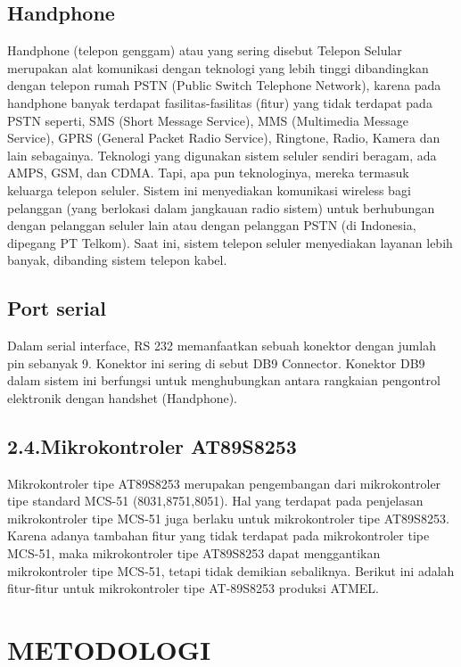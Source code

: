 \documentclass{jtetiproposalskripsi}
\begin{document}
\section{Handphone}
Handphone (telepon genggam) atau yang sering disebut Telepon Selular merupakan alat komunikasi dengan teknologi yang lebih tinggi dibandingkan dengan telepon rumah PSTN (Public Switch Telephone Network), karena pada handphone banyak terdapat fasilitas-fasilitas (fitur) yang tidak terdapat pada PSTN seperti, SMS (Short Message Service), MMS (Multimedia Message Service), GPRS (General Packet Radio Service), Ringtone, Radio, Kamera dan lain sebagainya. Teknologi yang digunakan sistem seluler sendiri beragam, ada AMPS, GSM, dan CDMA. Tapi, apa pun teknologinya, mereka termasuk keluarga telepon seluler. Sistem ini menyediakan komunikasi wireless bagi pelanggan (yang berlokasi dalam jangkauan radio sistem) untuk berhubungan dengan pelanggan seluler lain atau dengan pelanggan PSTN (di Indonesia, dipegang PT Telkom). Saat ini, sistem telepon seluler menyediakan layanan lebih banyak, dibanding sistem telepon kabel.


\section{Port serial}
Dalam serial interface, RS 232 memanfaatkan sebuah konektor dengan jumlah pin sebanyak 9. Konektor ini sering di sebut DB9 Connector. Konektor DB9 dalam sistem ini berfungsi untuk menghubungkan antara rangkaian pengontrol elektronik dengan handshet (Handphone).

\section{2.4.Mikrokontroler AT89S8253}
Mikrokontroler tipe AT89S8253 merupakan pengembangan dari mikrokontroler tipe standard MCS-51 (8031,8751,8051). Hal yang terdapat pada penjelasan mikrokontroler tipe MCS-51 juga berlaku untuk mikrokontroler tipe AT89S8253. Karena adanya tambahan fitur yang tidak terdapat pada mikrokontroler tipe MCS-51, maka mikrokontroler tipe AT89S8253 dapat menggantikan mikrokontroler tipe MCS-51, tetapi tidak demikian sebaliknya.
Berikut ini adalah fitur-fitur untuk mikrokontroler tipe AT-89S8253 produksi ATMEL.





\chapter{METODOLOGI}
\end{document}
